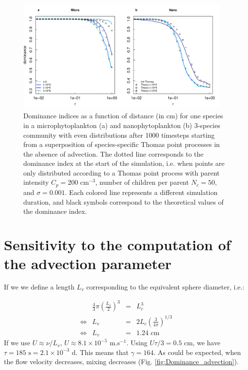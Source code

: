 \documentclass[english]{article}
\begin{document}
\begin{figure}[H]
\begin{centering}
\includegraphics[width=0.95\textwidth]{../code/figure/shift_of_dominance_noadv_zoom}
\par\end{centering}
\caption{Dominance indices as a function of distance (in cm) for one species
in a microphytoplankton (a) and nanophytoplankton (b) 3-species community
with even distributions after 1000 timesteps starting from a superposition
of species-specific Thomas point processes in the absence of advection.
The dotted line corresponds to the dominance index at the start of
the simulation, i.e. when points are only distributed according to
a Thomas point process with parent intensity $C_{p}=200$ cm$^{-3}$,
number of children per parent $N_{c}=50$, and $\sigma=0.001$. Each
colored line represents a different simulation duration, and black
symbols correspond to the theoretical values of the dominance index.\label{fig:Dominance-noadv_Thomas}}
\end{figure}


\section{Sensitivity to the computation of the advection parameter}

If we we define a length $L_{v}$ corresponding to the equivalent
sphere diameter, i.e.:

\begin{equation}
\begin{array}{cccc}
 & \frac{4}{3}\pi\left(\frac{L_{v}}{2}\right)^{3} & = & L_{c}^{3}\\
\Leftrightarrow & L_{v} & = & 2L_{c}\left(\frac{3}{4\pi}\right)^{1/3}\\
\Leftrightarrow & L_{v} & = & 1.24\text{ cm}
\end{array}\label{eq:re_lv}
\end{equation}
If we use $U\approx\nu/L_{v}$, $U\approx8.1\times10^{-5}$ m.s$^{-1}$.
Using $U\tau/3=0.5$ cm, we have $\tau=185\text{ s}=2.1\times10^{-3}$
d. This means that $\gamma=164$. As could be expected, when the flow
velocity decreases, mixing decreases (Fig. \ref{fig:Dominance_advection}).
\end{document}
